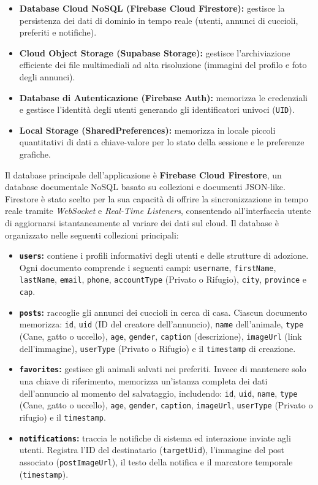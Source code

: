 \documentclass[a4paper]{report}
\begin{document}
\begin{itemize}
    \item \textbf{Database Cloud NoSQL (Firebase Cloud Firestore):} gestisce la persistenza dei dati di dominio in tempo reale (utenti, annunci di cuccioli, preferiti e notifiche).
    \item \textbf{Cloud Object Storage (Supabase Storage):} gestisce l'archiviazione efficiente dei file multimediali ad alta risoluzione (immagini del profilo e foto degli annunci).
    \item \textbf{Database di Autenticazione (Firebase Auth):} memorizza le credenziali e gestisce l'identità degli utenti generando gli identificatori univoci (\texttt{UID}).
    \item \textbf{Local Storage (SharedPreferences):} memorizza in locale piccoli quantitativi di dati a chiave-valore per lo stato della sessione e le preferenze grafiche.
\end{itemize}

Il database principale dell'applicazione è \textbf{Firebase Cloud Firestore}, un database documentale NoSQL basato su collezioni e documenti JSON-like. Firestore è stato scelto per la sua capacità di offrire la sincronizzazione in tempo reale tramite \textit{WebSocket} e \textit{Real-Time Listeners}, consentendo all'interfaccia utente di aggiornarsi istantaneamente al variare dei dati sul cloud.
\noindent Il database è organizzato nelle seguenti collezioni principali:
\begin{itemize}
    \item \textbf{\texttt{users}:} contiene i profili informativi degli utenti e delle strutture di adozione. Ogni documento comprende i seguenti campi: \texttt{username}, \texttt{firstName}, \texttt{lastName}, \texttt{email}, \texttt{phone}, \texttt{accountType} (Privato o Rifugio), \texttt{city}, \texttt{province} e \texttt{cap}.
    \item \textbf{\texttt{posts}:} raccoglie gli annunci dei cuccioli in cerca di casa. Ciascun documento memorizza: \texttt{id}, \texttt{uid} (ID del creatore dell'annuncio), \texttt{name} dell'animale, \texttt{type} (Cane, gatto o uccello), \texttt{age}, \texttt{gender}, \texttt{caption} (descrizione), \texttt{imageUrl} (link dell'immagine), \texttt{userType} (Privato o Rifugio) e il \texttt{timestamp} di creazione.
    \item \textbf{\texttt{favorites}:} gestisce gli animali salvati nei preferiti. Invece di mantenere solo una chiave di riferimento, memorizza un'istanza completa dei dati dell'annuncio al momento del salvataggio, includendo: \texttt{id}, \texttt{uid}, \texttt{name}, \texttt{type} (Cane, gatto o uccello), \texttt{age}, \texttt{gender}, \texttt{caption}, \texttt{imageUrl}, \texttt{userType} (Privato o rifugio) e il \texttt{timestamp}.
    \item \textbf{\texttt{notifications}:} traccia le notifiche di sistema ed interazione inviate agli utenti. Registra l'ID del destinatario (\texttt{targetUid}), l'immagine del post associato (\texttt{postImageUrl}), il testo della notifica e il marcatore temporale (\texttt{timestamp}).
\end{itemize}
\end{document}
